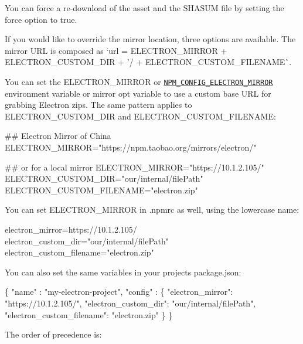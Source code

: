You can force a re-\/download of the asset and the {\ttfamily S\+H\+A\+S\+UM} file by setting the {\ttfamily force} option to {\ttfamily true}.

If you would like to override the mirror location, three options are available. The mirror U\+RL is composed as `url = E\+L\+E\+C\+T\+R\+O\+N\+\_\+\+M\+I\+R\+R\+OR + E\+L\+E\+C\+T\+R\+O\+N\+\_\+\+C\+U\+S\+T\+O\+M\+\_\+\+D\+IR + '/\textquotesingle{} + E\+L\+E\+C\+T\+R\+O\+N\+\_\+\+C\+U\+S\+T\+O\+M\+\_\+\+F\+I\+L\+E\+N\+A\+M\+E\`{}.

You can set the {\ttfamily E\+L\+E\+C\+T\+R\+O\+N\+\_\+\+M\+I\+R\+R\+OR} or \href{https://docs.npmjs.com/misc/config#environment-variables}{\tt {\ttfamily N\+P\+M\+\_\+\+C\+O\+N\+F\+I\+G\+\_\+\+E\+L\+E\+C\+T\+R\+O\+N\+\_\+\+M\+I\+R\+R\+OR}} environment variable or {\ttfamily mirror} opt variable to use a custom base U\+RL for grabbing Electron zips. The same pattern applies to {\ttfamily E\+L\+E\+C\+T\+R\+O\+N\+\_\+\+C\+U\+S\+T\+O\+M\+\_\+\+D\+IR} and {\ttfamily E\+L\+E\+C\+T\+R\+O\+N\+\_\+\+C\+U\+S\+T\+O\+M\+\_\+\+F\+I\+L\+E\+N\+A\+ME}\+:


\begin{DoxyCode}
## Electron Mirror of China
ELECTRON\_MIRROR="https://npm.taobao.org/mirrors/electron/"

## or for a local mirror
ELECTRON\_MIRROR="https://10.1.2.105/"
ELECTRON\_CUSTOM\_DIR="our/internal/filePath"
ELECTRON\_CUSTOM\_FILENAME="electron.zip"
\end{DoxyCode}


You can set E\+L\+E\+C\+T\+R\+O\+N\+\_\+\+M\+I\+R\+R\+OR in {\ttfamily .npmrc} as well, using the lowercase name\+:


\begin{DoxyCode}
electron\_mirror=https://10.1.2.105/
electron\_custom\_dir="our/internal/filePath"
electron\_custom\_filename="electron.zip"
\end{DoxyCode}


You can also set the same variables in your project\textquotesingle{}s package.\+json\+:


\begin{DoxyCode}
\{
    "name" : "my-electron-project",
    "config" : \{
        "electron\_mirror": "https://10.1.2.105/",
        "electron\_custom\_dir": "our/internal/filePath",
        "electron\_custom\_filename": "electron.zip"
    \}
\}
\end{DoxyCode}


The order of precedence is\+:


